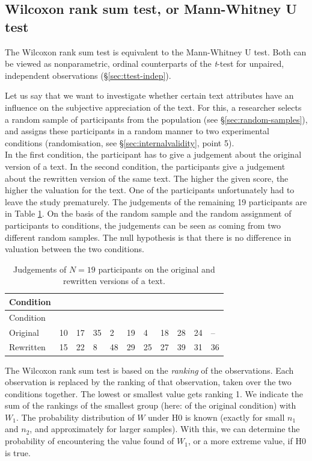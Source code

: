 \documentclass[
]{book}
\begin{document}
\subsection{Wilcoxon rank sum test, or Mann-Whitney U test}\label{sec:wilcoxon-rank-sum}

The Wilcoxon rank sum test is equivalent to the Mann-Whitney U test.
Both can be viewed as nonparametric, ordinal counterparts
of the \emph{t}-test for unpaired, independent observations
(§\ref{sec:ttest-indep}).

Let us say that we want to investigate whether certain text attributes
have an influence on the subjective appreciation of the text. For this,
a researcher selects a random sample of participants
from the population (see
§\ref{sec:random-samples}), and assigns these participants in a random
manner to two experimental conditions (randomisation, see
§\ref{sec:internalvalidity}, point 5).\\
In the first condition, the participant has to give a judgement about
the original version of a text. In the second condition, the participants
give a judgement about the rewritten version of the same text.
The higher the given score, the higher the valuation for the text.
One of the participants unfortunately had to leave the study
prematurely. The judgements of the remaining 19 participants
are in Table \ref{tab:data-originalrewritten}. On the basis of the random
sample and the random assignment of participants to conditions,
the judgements can be seen as coming from two different
random samples. The null hypothesis is that there is no difference
in valuation between the two conditions.

\begin{longtable}[]{@{}lllllllllll@{}}
\caption{\label{tab:data-originalrewritten} Judgements of \(N=19\) participants on
the original and rewritten versions of a text.}\tabularnewline
\toprule\noalign{}
Condition & & & & & & & & & & \\
\midrule\noalign{}
\endfirsthead
\toprule\noalign{}
Condition & & & & & & & & & & \\
\midrule\noalign{}
\endhead
\bottomrule\noalign{}
\endlastfoot
Original & 10 & 17 & 35 & 2 & 19 & 4 & 18 & 28 & 24 & -- \\
Rewritten & 15 & 22 & 8 & 48 & 29 & 25 & 27 & 39 & 31 & 36 \\
\end{longtable}

The Wilcoxon rank sum test is based on the \emph{ranking} of the
observations. Each observation is replaced by the ranking of
that observation, taken over the two conditions together. The lowest or
smallest value gets ranking 1. We indicate the sum of the rankings of the
smallest group (here: of the original condition) with
\(W_1\). The probability distribution of \(W\) under H0 is known (exactly for small
\(n_1\) and \(n_2\), and approximately for larger samples). With this, we can
determine the probability of encountering the value found of \(W_1\),
or a more extreme value, if H0 is true.
\end{document}
